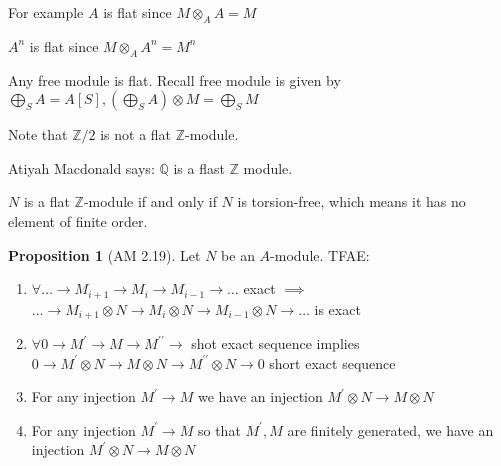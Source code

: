 \documentclass{article}
\theoremstyle{definition}
\newtheorem{proposition}{Proposition}
\begin{document}
For example \(A\) is flat since \(M \otimes_A A = M\) 

\(A^n\) is flat since \(M \otimes_A A^n = M^n\) 

Any free module is flat. Recall free module is given by \(\bigoplus_{S}^{} A = A[S],(\bigoplus_{S}^{} A)\otimes M = \bigoplus_{S}^{} M\) 

Note that \(\mathbb{Z} / 2\) is not a flat \(\mathbb{Z}\)-module.

Atiyah Macdonald says: \(\mathbb{Q}\) is a flast \(\mathbb{Z}\) module.

\(N\) is a flat \(\mathbb{Z}\)-module if and only if \(N\) is torsion-free, which means it has no element of finite order.

\begin{proposition}
    [AM 2.19]

    Let \(N\) be an \(A\)-module. TFAE:

    \begin{enumerate}
        \item \(\forall \dots \to M_{i+1} \to M_i \to M_{i-1} \to \dots   \) exact \(\implies \) \(\dots \to M_{i+1} \otimes N \to M_i \otimes N \to M_{i-1} \otimes N \to \dots \) is exact
        \item  \(\forall 0 \to M^{\prime} \to M \to M^{\prime\prime} \to \) shot exact sequence implies \(0 \to M^{\prime} \otimes N \to M \otimes N \to M^{\prime\prime} \otimes N \to 0\) short exact sequence
        \item For any injection \(M^{\prime}  \to M\) we have an injection \(M^{\prime} \otimes N \to M \otimes N\) 
        \item For any injection \(M^{\prime}  \to M\) so that \(M^{\prime} ,M\) are finitely generated, we have an injection \(M^{\prime} \otimes N \to M \otimes N\) 
    \end{enumerate}
\end{proposition}
\end{document}
